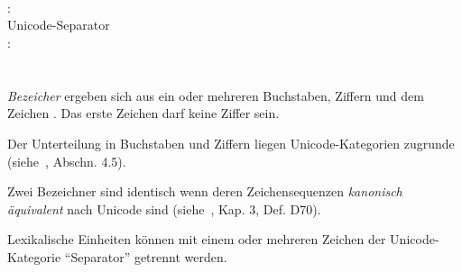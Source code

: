 \hspace*{1cm}  \\
\hspace*{1cm}\glq\Gt{\_}\grq \\
\hspace*{1cm}\glq\Gt{\_}\grq {} \\
:\label{Whitespace}\\
\hspace*{1cm}Unicode-Separator\\
:\label{WS}\\
\hspace*{1cm} \\
\hspace*{1cm}  \\

\emph{Bezeicher} ergeben sich aus ein oder mehreren Buchstaben, Ziffern und dem Zeichen \glq\kw{\_}\grq. Das erste Zeichen
darf keine Ziffer sein.

Der Unterteilung in Buchstaben und Ziffern liegen Unicode-Kategorien zugrunde (siehe~\cite{unicode}, Abschn. 4.5).

Zwei Bezeichner sind identisch wenn deren Zeichensequenzen \emph{kanonisch äquivalent} nach Unicode sind (siehe~\cite{unicode}, Kap. 3, Def. D70).

Lexikalische Einheiten können mit einem oder mehreren Zeichen der Unicode-Kategorie "`Separator"' getrennt werden.


